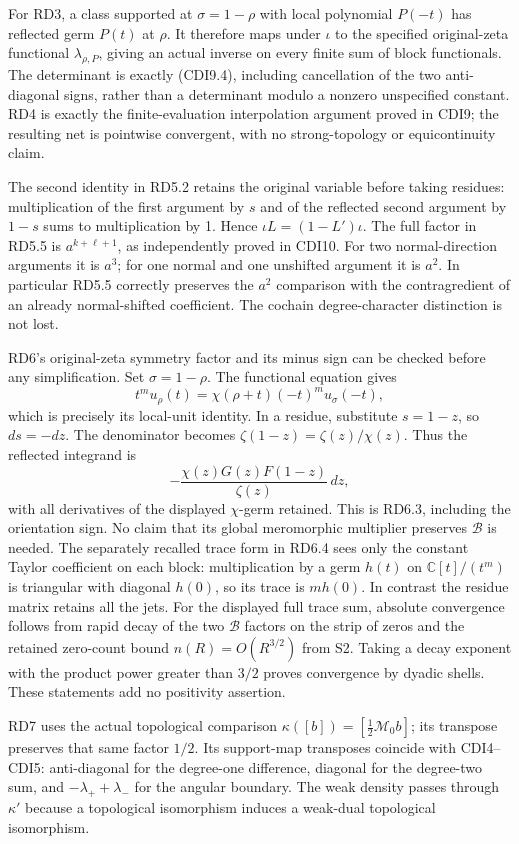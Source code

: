 For RD3, a class supported at \(\sigma=1-\rho\) with local polynomial
\(P(-t)\) has reflected germ \(P(t)\) at \(\rho\). It therefore maps
under \(\iota\) to the specified original-zeta functional
\(\lambda_{\rho,P}\), giving an actual inverse on every finite sum of
block functionals. The determinant is exactly (CDI9.4), including
cancellation of the two anti-diagonal signs, rather than a determinant
modulo a nonzero unspecified constant. RD4 is exactly the
finite-evaluation interpolation argument proved in CDI9; the resulting
net is pointwise convergent, with no strong-topology or equicontinuity
claim.

The second identity in RD5.2 retains the original variable before taking
residues: multiplication of the first argument by \(s\) and of the
reflected second argument by \(1-s\) sums to multiplication by 1. Hence
\(\iota L=(1-L')\iota\). The full factor in RD5.5 is \(a^{k+\ell+1}\),
as independently proved in CDI10. For two normal-direction arguments it
is \(a^3\); for one normal and one unshifted argument it is \(a^2\). In
particular RD5.5 correctly preserves the \(a^2\) comparison with the
contragredient of an already normal-shifted coefficient. The cochain
degree-character distinction is not lost.

RD6's original-zeta symmetry factor and its minus sign can be checked
before any simplification. Set \(\sigma=1-\rho\). The functional
equation gives \[
t^m u_\rho(t)=\chi(\rho+t)(-t)^m u_\sigma(-t),
\] which is precisely its local-unit identity. In a residue, substitute
\(s=1-z\), so \(ds=-dz\). The denominator becomes
\(\zeta(1-z)=\zeta(z)/\chi(z)\). Thus the reflected integrand is \[
-\frac{\chi(z)G(z)F(1-z)}{\zeta(z)}\,dz,
\] with all derivatives of the displayed \(\chi\)-germ retained. This is
RD6.3, including the orientation sign. No claim that its global
meromorphic multiplier preserves \(\mathcal B\) is needed. The
separately recalled trace form in RD6.4 sees only the constant Taylor
coefficient on each block: multiplication by a germ \(h(t)\) on
\(\mathbb C[t]/(t^m)\) is triangular with diagonal \(h(0)\), so its
trace is \(m h(0)\). In contrast the residue matrix retains all the
jets. For the displayed full trace sum, absolute convergence follows
from rapid decay of the two \(\mathcal B\) factors on the strip of zeros
and the retained zero-count bound \(n(R)=O(R^{3/2})\) from S2. Taking a
decay exponent with the product power greater than \(3/2\) proves
convergence by dyadic shells. These statements add no positivity
assertion.

RD7 uses the actual topological comparison
\(\kappa([b])=[\tfrac12\mathcal M_0b]\); its transpose preserves that
same factor \(1/2\). Its support-map transposes coincide with
CDI4--CDI5: anti-diagonal for the degree-one difference, diagonal for
the degree-two sum, and \(-\lambda_++\lambda_-\) for the angular
boundary. The weak density passes through \(\kappa'\) because a
topological isomorphism induces a weak-dual topological isomorphism.

